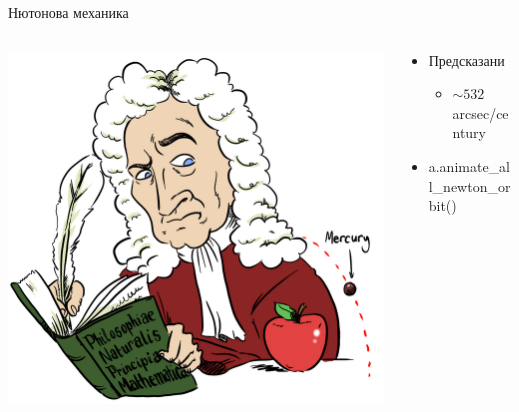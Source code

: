 \documentclass[10pt,a4paper]{beamer}
\begin{document}
        \begin{frame}{ Нютонова механика }
            \begin{columns}
                \begin{column}{0.5\textwidth}
                    \includegraphics[width=\textwidth]{images/newton_mercury_perih.png}
                \end{column}
                \begin{column}{0.5\textwidth}
                    \begin{itemize}
                        \item Предсказани \begin{itemize}
                            \item $ \sim 532 $ arcsec/century
                        \end{itemize}
                        \item a.animate\_all\_newton\_orbit()
                    \end{itemize}
                \end{column}
            \end{columns}
        \end{frame}
    
\end{document}
